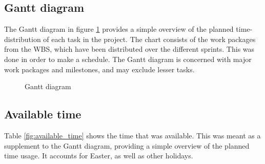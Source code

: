 \subsection{Gantt diagram}
\label{subsec:process_and_methodology-resource_management-gantt_diagram}

The Gantt diagram in figure \ref{fig:gantt} provides a simple overview of the planned time-distribution of each task in the project. The chart consists of the work packages from the WBS, which have been distributed over the different sprints. This was done in order to make a schedule. The Gantt diagram is concerned with major work packages and milestones, and may exclude lesser tasks.

\begin{center}
  \begin{figure}[ht!]
    \caption{Gantt diagram}
    \label{fig:gantt}
  \end{figure}
\end{center}

\subsection{Available time}
\label{subsec:process_and_methodology-resource_management-available_time}

Table \ref{fig:available_time} shows the time that was available. This was meant as a supplement to the Gantt diagram, providing a simple overview of the planned time usage. It accounts for Easter, as well as other holidays.


